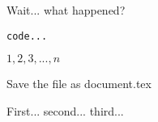 Wait... what happened?

\begin{verbatim}
code...
\end{verbatim}

$1, 2, 3, ..., n$

Save the file as document.tex

First... second... third...

